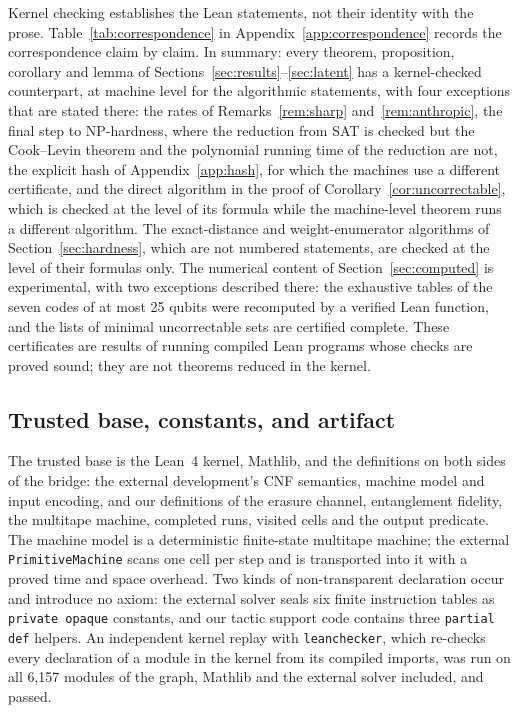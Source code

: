 \documentclass[11pt]{article}
\theoremstyle{remark}
\newcommand{\lean}[1]{\texttt{#1}}
\begin{document}
Kernel checking establishes the Lean statements, not their identity with
the prose. Table~\ref{tab:correspondence} in
Appendix~\ref{app:correspondence} records the correspondence claim by
claim. In summary: every theorem, proposition, corollary and lemma of
Sections~\ref{sec:results}--\ref{sec:latent} has a kernel-checked
counterpart, at machine level for the algorithmic statements, with four
exceptions that are stated there: the rates of
Remarks~\ref{rem:sharp} and~\ref{rem:anthropic}, the final step to
NP-hardness, where the reduction from SAT is checked but the
Cook--Levin theorem and the polynomial running time of the reduction
are not,
the explicit hash of Appendix~\ref{app:hash}, for which the machines use
a different certificate, and the direct algorithm in the proof of
Corollary~\ref{cor:uncorrectable}, which is checked at the level of its
formula while the machine-level theorem runs a different algorithm. The exact-distance and weight-enumerator algorithms of
Section~\ref{sec:hardness}, which are not numbered statements, are
checked at the level of their formulas only. The numerical content of
Section~\ref{sec:computed} is experimental, with two exceptions described
there: the exhaustive tables of the seven codes of at most 25 qubits
were recomputed by a verified Lean function, and the lists of minimal
uncorrectable sets are certified complete. These certificates are
results of running compiled Lean programs whose checks are proved
sound; they are not theorems reduced in the kernel.

\subsection{Trusted base, constants, and artifact}

The trusted base is the Lean~4 kernel, Mathlib, and the definitions on
both sides of the bridge: the external development's CNF semantics,
machine model and input encoding, and our definitions of the erasure
channel, entanglement fidelity, the multitape machine, completed runs,
visited cells and the output predicate. The machine model is a
deterministic finite-state multitape machine; the external
\lean{PrimitiveMachine} scans one cell per step and is transported into
it with a proved time and space overhead. Two kinds of non-transparent
declaration occur and introduce no axiom: the external solver seals six
finite instruction tables as \lean{private opaque} constants, and our
tactic support code contains three \lean{partial def} helpers. An independent kernel replay
with \texttt{leanchecker}, which re-checks every declaration of a module
in the kernel from its compiled imports, was run on all 6{,}157 modules
of the graph, Mathlib and the external solver included, and passed.
\end{document}
